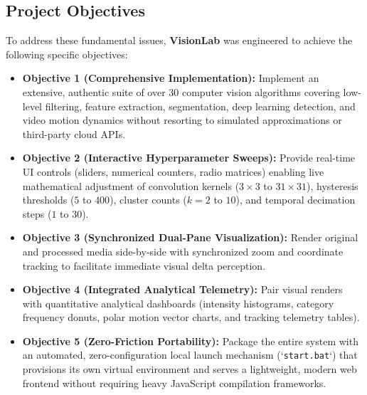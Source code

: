 \subsection{Project Objectives}
To address these fundamental issues, \textbf{VisionLab} was engineered to achieve the following specific objectives:
\begin{itemize}
    \item \textbf{Objective 1 (Comprehensive Implementation):} Implement an extensive, authentic suite of over 30 computer vision algorithms covering low-level filtering, feature extraction, segmentation, deep learning detection, and video motion dynamics without resorting to simulated approximations or third-party cloud APIs.
    \item \textbf{Objective 2 (Interactive Hyperparameter Sweeps):} Provide real-time UI controls (sliders, numerical counters, radio matrices) enabling live mathematical adjustment of convolution kernels ($3\times3$ to $31\times31$), hysteresis thresholds ($5$ to $400$), cluster counts ($k=2$ to $10$), and temporal decimation steps ($1$ to $30$).
    \item \textbf{Objective 3 (Synchronized Dual-Pane Visualization):} Render original and processed media side-by-side with synchronized zoom and coordinate tracking to facilitate immediate visual delta perception.
    \item \textbf{Objective 4 (Integrated Analytical Telemetry):} Pair visual renders with quantitative analytical dashboards (intensity histograms, category frequency donuts, polar motion vector charts, and tracking telemetry tables).
    \item \textbf{Objective 5 (Zero-Friction Portability):} Package the entire system with an automated, zero-configuration local launch mechanism (`\texttt{start.bat}`) that provisions its own virtual environment and serves a lightweight, modern web frontend without requiring heavy JavaScript compilation frameworks.
\end{itemize}
